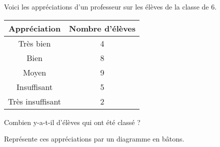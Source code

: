 Voici les appréciations d'un professeur sur les élèves de la classe de
6.
\begin{center}
  \begin{tabular}{|c|c|}
    \hline
{\bf Appréciation}&{\bf Nombre d'élèves}\\
\hline
Très bien&4\\
\hline
Bien&8\\
\hline
Moyen&9\\
\hline
Insuffisant&5\\
\hline
Très insuffisant&2\\
\hline
  \end{tabular}
\end{center}
\begin{myenumerate}
\item Combien y-a-t-il d'élèves qui ont été classé ?
\item Représente ces appréciations par un diagramme en bâtons.
\end{myenumerate}